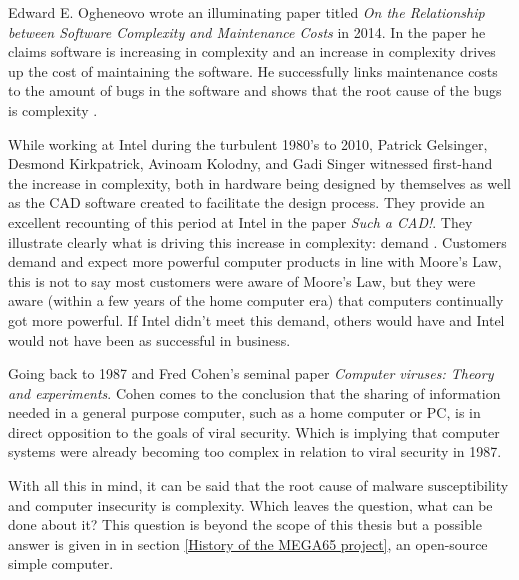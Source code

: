 Edward E. Ogheneovo wrote an illuminating paper titled \textit{On the Relationship between Software
Complexity and Maintenance Costs} in 2014. In the paper he claims software is increasing in complexity and an increase in complexity drives up the cost of maintaining the software. He successfully links  maintenance costs to the amount of bugs in the software and shows that the root cause of the bugs is complexity \cite{RN81}. 

While working at Intel during the turbulent 1980's to 2010, Patrick Gelsinger, Desmond Kirkpatrick,
Avinoam Kolodny, and Gadi Singer witnessed first-hand the increase in complexity, both in hardware being designed by themselves as well as the CAD software created to facilitate the design process. They provide an excellent recounting of this period at Intel in the paper \textit{Such a CAD!}. They illustrate clearly what is driving this increase in complexity: demand \cite{RN18}. Customers demand and expect more powerful computer products in line with Moore's Law, this is not to say most customers were aware of Moore's Law, but they were aware (within a few years of the home computer era) that computers continually got more powerful. If Intel didn't meet this demand, others would have and Intel would not have been as successful in business.

Going back to 1987 and Fred Cohen's seminal paper \textit{Computer viruses: Theory and experiments}. Cohen comes to the conclusion that the sharing of information needed in a general purpose computer, such as a home computer or PC, is in direct opposition to the goals of viral security. Which is implying that computer systems were already becoming too complex in relation to viral security in 1987.

With all this in mind, it can be said that the root cause of malware susceptibility and computer insecurity is complexity. Which leaves the question, what can be done about it? This question is beyond the scope of this thesis but a possible answer is given in in section \ref{History of the MEGA65 project}, an open-source simple computer.

